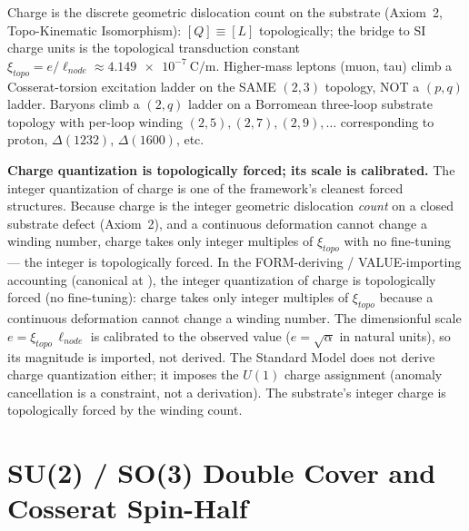 

Charge is the discrete geometric dislocation count on the substrate (Axiom~2, Topo-Kinematic Isomorphism): $[Q] \equiv [L]$ topologically; the bridge to SI charge units is the topological transduction constant $\xi_{topo} = e/\ell_{node} \approx \qty{4.149e-7}{\coulomb\per\metre}$. Higher-mass leptons (muon, tau) climb a Cosserat-torsion excitation ladder on the SAME $(2, 3)$ topology, NOT a $(p, q)$ ladder. Baryons climb a $(2, q)$ ladder on a Borromean three-loop substrate topology with per-loop winding $(2, 5), (2, 7), (2, 9), \ldots$ corresponding to proton, $\Delta(1232)$, $\Delta(1600)$, etc.

\textbf{Charge quantization is topologically forced; its scale is calibrated.} The integer quantization of charge is one of the framework's cleanest forced structures. Because charge is the integer geometric dislocation \emph{count} on a closed substrate defect (Axiom~2), and a continuous deformation cannot change a winding number, charge takes only integer multiples of $\xi_{topo}$ with no fine-tuning --- the integer is topologically forced. In the FORM-deriving / VALUE-importing accounting (canonical at ), the integer quantization of charge is topologically forced (no fine-tuning): charge takes only integer multiples of $\xi_{topo}$ because a continuous deformation cannot change a winding number. The dimensionful scale $e = \xi_{topo}\,\ell_{node}$ is calibrated to the observed value ($e = \sqrt{\alpha}$ in natural units), so its magnitude is imported, not derived. The Standard Model does not derive charge quantization either; it imposes the $U(1)$ charge assignment (anomaly cancellation is a constraint, not a derivation). The substrate's integer charge is topologically forced by the winding count.

\section{SU(2) / SO(3) Double Cover and Cosserat Spin-Half}
\label{sec:vol9_su2_so3_double_cover}

